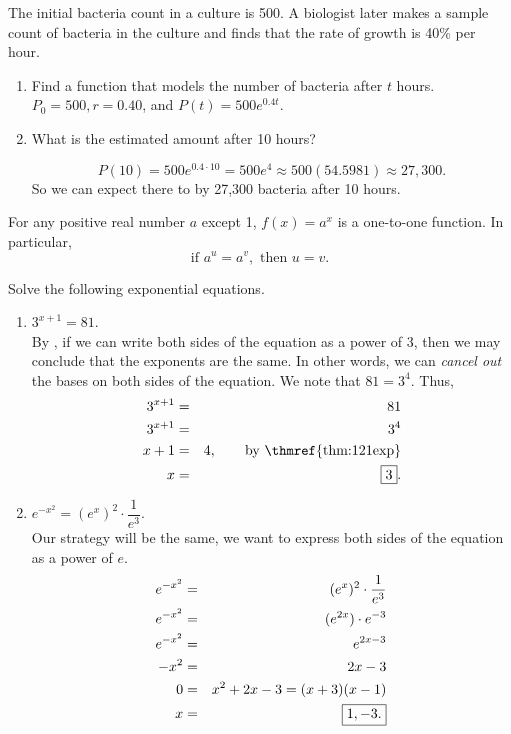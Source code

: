 \documentclass{book}
\begin{document}
\begin{Exam} The initial bacteria count in a culture is 500. A biologist later makes a sample count of bacteria in the culture and finds that the rate of growth is 40\% per hour.
\begin{enumerate}
\item Find a function that models the number of bacteria after $t$ hours.\\

$P_0 = 500, r = 0.40$, and $P(t) = 500e^{0.4t}.$\\

\item What is the estimated amount after 10 hours?

\[P(10) = 500e^{0.4\cdot10} = 500e^4 \approx 500(54.5981) \approx 27,300.\]\vs So we can expect there to by 27,300 bacteria after 10 hours. 
\end{enumerate}
\end{Exam}\vs

\begin{Thm}\label{thm:121exp} For any positive real number $a$ except 1, $f(x) = a^x$ is a one-to-one function. In particular, 
\[\text{if } a^u=a^v, \text{ then } u=v.\]
\end{Thm}\vs

\begin{Exam} Solve the following exponential equations.
\begin{enumerate}
\item $3^{x+1} = 81$. \\

By , if we can write both sides of the equation as a power of 3, then we may conclude that the exponents are the same. In other words, we can \emph{cancel out} the bases on both sides of the equation. We note that $81 = 3^4$. Thus,
\begin{eqnarray*}
3^{x+1} &=& 81\\
3^{x+1} &=& 3^4\\
x+1 &=& 4, \qquad\mbox{by \thmref{thm:121exp}}\\
x &=& \fbox{$3$}.
\end{eqnarray*}

\item $e^{-x^2} = (e^x)^2\cdot \dfrac{1}{e^3}$.\\

Our strategy will be the same, we want to express both sides of the equation as a power of $e$.
\begin{eqnarray*}
e^{-x^2} &=& (e^x)^2\cdot \dfrac{1}{e^3}\\
e^{-x^2} &=& (e^{2x})\cdot e^{-3}\\
e^{-x^2} &=& e^{2x-3}\\
-x^2 &=& 2x-3\\
0 &=& x^2 + 2x-3 = (x+3)(x-1)\\
x &=& \fbox{$1, -3.$}
\end{eqnarray*}
\end{enumerate}
\end{Exam}\vs
\end{document}
